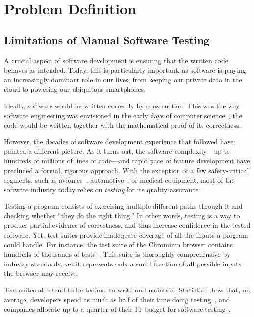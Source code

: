 \section{Problem Definition}

\subsection{Limitations of Manual Software Testing}

A crucial aspect of software development is ensuring that the written code behaves as intended.  Today, this is particularly important, as software is playing an increasingly dominant role in our lives, from keeping our private data in the cloud to powering our ubiquitous smartphones.

Ideally, software would be written correctly by construction.  This was the way software engineering was envisioned in the early days of computer science~\cite{dijkstra1976discipline}; the code would be written together with the mathematical proof of its correctness.

However, the decades of software development experience that followed have painted a different picture.  As it turns out, the software complexity---up to hundreds of millions of lines of code---and rapid pace of feature development have precluded a formal, rigorous approach.
%
With the exception of a few safety-critical segments, such as avionics~\cite{Astree}, automotive~\cite{automotive}, or medical equipment, most of the software industry today relies on \emph{testing} for its quality assurance~\cite{softwareMetrics}.

Testing a program consists of exercising multiple different paths through it and checking whether ``they do the right thing.''
%
In other words, testing is a way to produce partial evidence of correctness, and thus increase confidence in the tested software.
%
Yet, test suites provide inadequate coverage of all the inputs a program could handle.
%
For instance, the test suite of the Chromium browser contains hundreds of thousands of tests~\cite{chrome-tests}.  This suite is thoroughly comprehensive by industry standards, yet it represents only a small fraction of all possible inputs the browser may receive.

%
Test suites also tend to be tedious to write and maintain.  Statistics show that, on average, developers spend as much as half of their time doing testing~\cite{codeComplete}, and companies allocate up to a quarter of their IT budget for software testing~\cite{capgemini-world-quality}.

